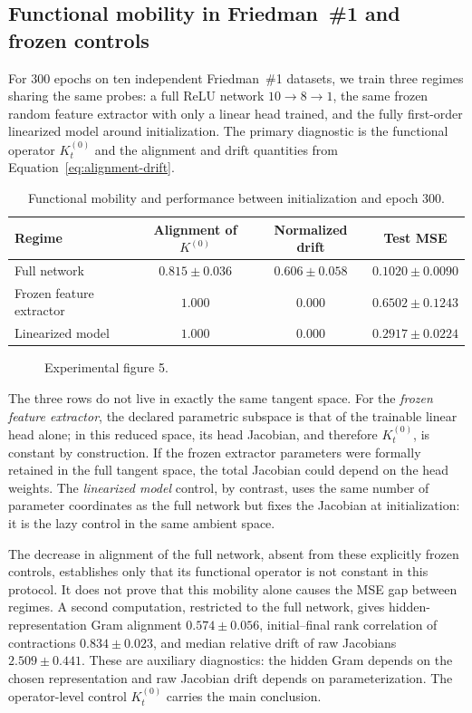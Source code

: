 \subsection{Functional mobility in Friedman~\#1 and frozen controls}
\label{subsec:functional-drift}
For $300$ epochs on ten independent Friedman~\#1 datasets, we train three regimes sharing the same probes: a full ReLU network $10\to8\to1$, the same frozen random feature extractor with only a linear head trained, and the fully first-order linearized model around initialization. The primary diagnostic is the functional operator $K_t^{(0)}$ and the alignment and drift quantities from Equation~\eqref{eq:alignment-drift}.

\begin{table}[H]
\centering
\caption{Functional mobility and performance between initialization and epoch 300.}
\label{tab:functional-drift}
\small
\begin{tabular}{@{}lccc@{}}
\toprule
Regime & Alignment of $K^{(0)}$ & Normalized drift & Test MSE \\
\midrule
Full network & $0.815\pm0.036$ & $0.606\pm0.058$ & $0.1020\pm0.0090$ \\
Frozen feature extractor & $1.000$ & $0.000$ & $0.6502\pm0.1243$ \\
Linearized model & $1.000$ & $0.000$ & $0.2917\pm0.0224$ \\
\bottomrule
\end{tabular}
\end{table}

\begin{figure}[htbp]
\centering{}
\caption{Experimental figure 5.}\label{fig:functional-drift}
\end{figure}

The three rows do not live in exactly the same tangent space. For the \emph{frozen feature extractor}, the declared parametric subspace is that of the trainable linear head alone; in this reduced space, its head Jacobian, and therefore $K_t^{(0)}$, is constant by construction. If the frozen extractor parameters were formally retained in the full tangent space, the total Jacobian could depend on the head weights. The \emph{linearized model} control, by contrast, uses the same number of parameter coordinates as the full network but fixes the Jacobian at initialization: it is the lazy control in the same ambient space.

The decrease in alignment of the full network, absent from these explicitly frozen controls, establishes only that its functional operator is not constant in this protocol. It does not prove that this mobility alone causes the MSE gap between regimes. A second computation, restricted to the full network, gives hidden-representation Gram alignment $0.574\pm0.056$, initial--final rank correlation of contractions $0.834\pm0.023$, and median relative drift of raw Jacobians $2.509\pm0.441$. These are auxiliary diagnostics: the hidden Gram depends on the chosen representation and raw Jacobian drift depends on parameterization. The operator-level control $K_t^{(0)}$ carries the main conclusion.

